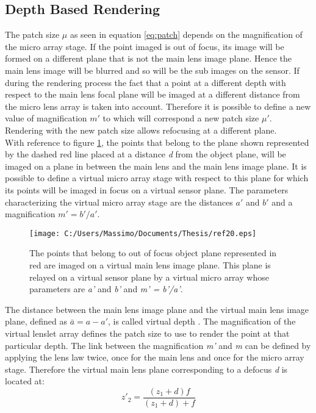 \subsection{Depth Based Rendering}
\label{sec:depthbased}
The patch size $\mu$ as seen in equation \ref{eq:patch} depends on the magnification of the micro array stage. If the point imaged is out of focus, its image will be formed on a different plane that is not the main lens image plane. Hence the main lens image will be blurred and so will be the sub images on the sensor. If during the rendering process the fact that a point at a different depth with respect to the main lens focal plane will be imaged at a different distance from the micro lens array is taken into account. Therefore it is possible to define a new value of magnification $m'$ to which will correspond a new patch size $\mu'$.
Rendering with the new patch size allows refocusing at a different plane.\\
 With reference to figure \ref{fig:def20}, the points that belong to the plane shown represented by the dashed red line placed at a distance \textit{d} from the object plane, will be imaged on a plane in between the main lens and the main lens image plane. It is possible to define a virtual micro array stage with respect to this plane for which its points will be imaged in focus on a virtual sensor plane. The parameters characterizing the virtual micro array stage are the distances $a' $ and $b' $ and a magnification $m' = b'/a'$.
\begin{figure}[H]
	\centering
	\texttt{[image: C:/Users/Massimo/Documents/Thesis/ref20.eps]}
	\caption{\label{fig:def20} The points that belong to out of focus object plane represented in red are imaged on a virtual main lens image plane. This plane is relayed on a virtual sensor plane by a virtual micro array whose parameters are  \textit{a'} and \textit{b'} and \textit{m' = b'/a'}. }
\end{figure}
The distance between the main lens image plane and the virtual main lens image plane, defined as \textit{$\bar{a} = a-a'$}, is called virtual depth \cite{perwass2012single}. The magnification of the virtual lenslet array defines the patch size to use to render the point at that particular depth. The link between the magnification \textit{m'} and \textit{m} can be defined by applying the lens law twice, once for the main lens and once for the micro array stage.
Therefore the virtual main lens plane corresponding to a defocus \textit{d} is located at:
\begin{equation}
	\label{eq:def201}
	z'_2 = \dfrac{(z_1+d)f}{(z_1+d)+f}
\end{equation}

